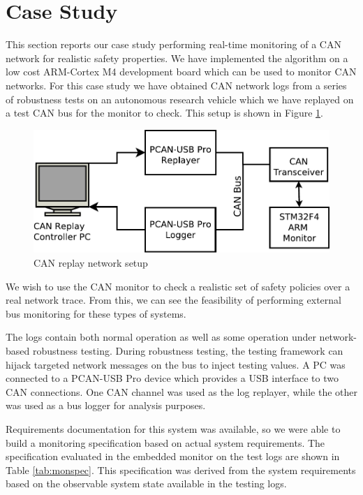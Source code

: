 

\section{Case Study}

This section reports our case study performing real-time monitoring of a CAN network for realistic safety properties. We have implemented the \monitor algorithm on a low cost ARM-Cortex M4 development board which can be used to monitor CAN networks. For this case study we have obtained CAN network logs from a series of robustness tests on an autonomous research vehicle which we have replayed on a test CAN bus for the monitor to check. This setup is shown in Figure \ref{fig:replaySchem}.

\begin{figure}
\centering
\includegraphics[width=4.5in]{img/replay_arch}
\caption{CAN replay network setup \label{fig:replaySchem}}
\end{figure}

We wish to use the CAN monitor to check a realistic set of safety policies over a real network trace. From this, we can see the feasibility of performing external bus monitoring for these types of systems.

The logs contain both normal operation as well as some operation under network-based robustness testing. During robustness testing, the testing framework can hijack targeted network messages on the bus to inject testing values. %
A PC was connected to a PCAN-USB Pro \cite{PCAN-USBPro} device which provides a USB interface to two CAN connections. One CAN channel was used as the log replayer, while the other was used as a bus logger for analysis purposes.

Requirements documentation for this system was available, so we were able to build a monitoring specification based on actual system requirements.
The specification evaluated in the embedded monitor on the test logs are shown in Table \ref{tab:monspec}. This specification was derived from the system requirements based on the observable system state available in the testing logs. 


